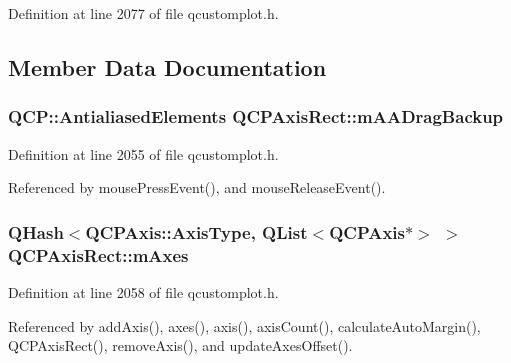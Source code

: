 Definition at line 2077 of file qcustomplot.\+h.



\subsection{Member Data Documentation}
\hypertarget{class_q_c_p_axis_rect_aa4a24f76360cfebe1bcf17a77fa7521b}{}
\subsubsection[{m\+A\+A\+Drag\+Backup}]{\setlength{\rightskip}{0pt plus 5cm}Q\+C\+P\+::\+Antialiased\+Elements Q\+C\+P\+Axis\+Rect\+::m\+A\+A\+Drag\+Backup\hspace{0.3cm}{\ttfamily [protected]}}\label{class_q_c_p_axis_rect_aa4a24f76360cfebe1bcf17a77fa7521b}


Definition at line 2055 of file qcustomplot.\+h.



Referenced by mouse\+Press\+Event(), and mouse\+Release\+Event().

\hypertarget{class_q_c_p_axis_rect_afe7a24d2a2bea98fc552fa826350ba81}{}
\subsubsection[{m\+Axes}]{\setlength{\rightskip}{0pt plus 5cm}Q\+Hash$<${\bf Q\+C\+P\+Axis\+::\+Axis\+Type}, Q\+List$<${\bf Q\+C\+P\+Axis}$\ast$$>$ $>$ Q\+C\+P\+Axis\+Rect\+::m\+Axes\hspace{0.3cm}{\ttfamily [protected]}}\label{class_q_c_p_axis_rect_afe7a24d2a2bea98fc552fa826350ba81}


Definition at line 2058 of file qcustomplot.\+h.



Referenced by add\+Axis(), axes(), axis(), axis\+Count(), calculate\+Auto\+Margin(), Q\+C\+P\+Axis\+Rect(), remove\+Axis(), and update\+Axes\+Offset().

\hypertarget{class_q_c_p_axis_rect_a5748e1a37f63c428e38b0a7724b46259}{}
